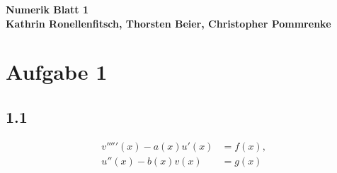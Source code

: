 \documentclass[10pt,oneside,a4paper]{scrartcl}
\begin{document}

	\begin{center}
		\huge %
		\bfseries %
		\sffamily %
		Numerik Blatt 1\\[1em]
		\normalsize
		Kathrin Ronellenfitsch, Thorsten Beier, Christopher Pommrenke
	\end{center}

	
	\section*{Aufgabe 1}

    	\subsection*{1.1}

		\begin{align*}
			v'''''(x) - a(x)u'(x) &= f(x),	\\
			u''(x) - b(x)v(x) &= g(x)
		\end{align*}
\end{document}
